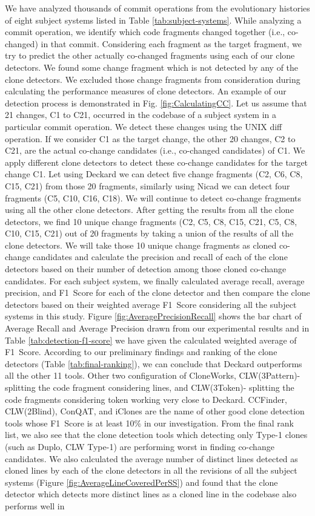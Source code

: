 \documentclass[review]{elsarticle}
\begin{document}
We have analyzed thousands of commit operations from the evolutionary histories of eight subject systems listed in Table \ref{tab:subject-systems}. While analyzing a commit operation, we identify which code fragments changed together (i.e., co-changed) in that commit. Considering each fragment as the target fragment, we try to predict the other actually co-changed fragments using each of our clone detectors. We found some change fragment which is not detected by any of the clone detectors. We excluded those change fragments from consideration during calculating the performance measures of clone detectors. An example of our detection process is demonstrated in Fig. \ref{fig:CalculatingCC}. Let us assume that 21 changes, C1 to C21, occurred in the codebase of a subject system in a particular commit operation. We detect these changes using the UNIX diff operation. If we consider C1 as the target change, the other 20 changes, C2 to C21, are the actual co-change candidates (i.e., co-changed candidates) of C1. We apply different clone detectors to detect these co-change candidates for the target change C1. Let using Deckard we can detect five change fragments (C2, C6, C8, C15, C21) from those 20 fragments, similarly using Nicad we can detect four fragments (C5, C10, C16, C18). We will continue to detect co-change fragments using all the other clone detectors. After getting the results from all the clone detectors, we find 10 unique change fragments (C2, C5, C8, C15, C21, C5, C8, C10, C15, C21) out of 20 fragments by taking a union of the results of all the clone detectors. We will take those 10 unique change fragments as cloned co-change candidates and calculate the precision and recall of each of the clone detectors based on their number of detection among those cloned co-change candidates. For each subject system, we finally calculated average recall, average precision, and F1~Score for each of the clone detector and then compare the clone detectors based on their weighted average F1~Score considering all the subject systems in this study. Figure \ref{fig:AveragePrecisionRecall} shows the bar chart of Average Recall and Average Precision drawn from our experimental results and in Table \ref{tab:detection-f1-score} we have given the calculated weighted average of F1~Score. According to our preliminary findings and ranking of the clone detectors (Table \ref{tab:final-ranking}), we can conclude that Deckard outperforms all the other 11 tools. Other two configuration of CloneWorks, CLW(3Pattern)-splitting the code fragment considering lines, and CLW(3Token)- splitting the code fragments considering token working very close to Deckard. CCFinder, CLW(2Blind), ConQAT, and iClones are the name of other good clone detection tools whose F1~Score is at least 10\% in our investigation. From the final rank list, we also see that the clone detection tools which detecting only Type-1 clones (such as Duplo, CLW Type-1) are performing worst in finding co-change candidates.  We also calculated the average number of distinct lines detected as cloned lines by each of the clone detectors in all the revisions of all the subject systems (Figure \ref{fig:AverageLineCoveredPerSS}) and found that the clone detector which detects more distinct lines as a cloned line in the codebase also performs well in 
\end{document}
